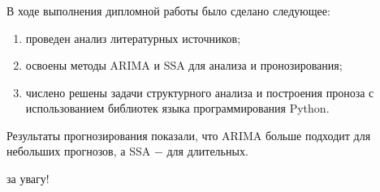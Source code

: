 \documentclass[c]{beamer}
\begin{document}
\begin{frame}
	\frametitle{\insertsection}
	В ходе выполнения дипломной работы было сделано следующее:\pause
	\begin{enumerate}
		\item проведен анализ литературных источников;\pause
		\item освоены методы ARIMA и SSA для анализа и пронозирования;\pause
		\item числено решены задачи структурного анализа и построения проноза с использованием библиотек языка программирования Python.\pause
	\end{enumerate}

	Результаты прогнозирования показали, что ARIMA больше подходит для небольших прогнозов, а SSA $-$ для длительных.
\end{frame}

\begin{frame}
	\centering{} за увагу!
\end{frame}
\end{document}
